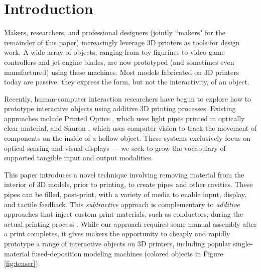 
\section{Introduction}
Makers, researchers, and professional designers (jointly ``makers" for the remainder of this paper) increasingly leverage 3D printers as tools for design work.  A wide array of objects, ranging from toy figurines to video game controllers and jet engine blades, are now prototyped (and sometimes even manufactured) using these machines.  Most models fabricated on 3D printers today are passive: they express the form, but not the interactivity, of an object.  

Recently, human-computer interaction researchers have begun to explore how to prototype interactive objects using additive 3D printing processes.
Existing approaches include Printed Optics \cite{Willis-printedoptics}, which uses light pipes printed in optically clear material, and Sauron \cite{Savage-sauron}, which uses computer vision to track the movement of components on the inside of a hollow object. These systems exclusively focus on optical sensing and visual displays --- we seek to grow the vocabulary of supported tangible input and output modalities.

This paper introduces a novel technique involving removing material from the interior of 3D models, prior to printing, to create pipes and other cavities.  These pipes can be filled, post-print, with a variety of media to enable input, display, and tactile feedback.  This {\em subtractive} approach is complementary to {\em additive} approaches that inject custom print materials, such as conductors, during the actual printing process \cite{Sells-reprap}. While our approach requires some manual assembly after a print completes, it gives makers the opportunity to cheaply and rapidly prototype a range of interactive objects on 3D printers, including popular single-material fused-deposition modeling machines (colored objects in Figure \ref{fig:teaser}).


